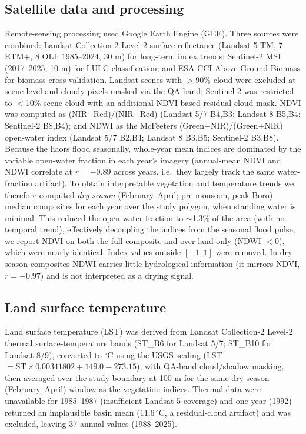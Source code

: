 \documentclass[preprint,authoryear,12pt]{elsarticle}
\begin{document}
\subsection{Satellite data and processing}
\label{subsec:rs}
Remote-sensing processing used Google Earth Engine (GEE). Three sources were combined:
Landsat Collection-2 Level-2 surface reflectance (Landsat 5 TM, 7 ETM+, 8 OLI; 1985--2024,
30 m) for long-term index trends; Sentinel-2 MSI (2017--2025, 10 m) for LULC classification;
and ESA CCI Above-Ground Biomass for biomass cross-validation. Landsat scenes with $>$90\%
cloud were excluded at scene level and cloudy pixels masked via the QA band; Sentinel-2 was
restricted to $<$10\% scene cloud with an additional NDVI-based residual-cloud mask. NDVI was
computed as (NIR$-$Red)/(NIR$+$Red) (Landsat 5/7 B4,B3; Landsat 8 B5,B4; Sentinel-2 B8,B4);
and NDWI as the McFeeters (Green$-$NIR)/(Green$+$NIR) open-water index \citep{McFeeters1996}
(Landsat 5/7 B2,B4; Landsat 8 B3,B5; Sentinel-2 B3,B8). Because the haors flood seasonally, whole-year mean indices are dominated by the variable open-water
fraction in each year's imagery (annual-mean NDVI and NDWI correlate at $r=-0.89$ across years,
i.e.\ they largely track the same water-fraction artifact). To obtain interpretable vegetation
and temperature trends we therefore computed \emph{dry-season} (February--April; pre-monsoon,
peak-Boro) median composites for each year over the study polygon, when standing water is
minimal. This reduced the open-water fraction to $\sim$1.3\% of the area (with no temporal trend),
effectively decoupling the indices from the seasonal flood pulse; we report NDVI on both the full
composite and over land only (NDWI $<0$), which were nearly identical. Index values outside
$[-1,1]$ were removed. In dry-season composites NDWI carries little hydrological information (it
mirrors NDVI, $r=-0.97$) and is not interpreted as a drying signal.

\subsection{Land surface temperature}
\label{subsec:lst}
Land surface temperature (LST) was derived from Landsat Collection-2 Level-2 thermal
surface-temperature bands (ST\_B6 for Landsat 5/7; ST\_B10 for Landsat 8/9), converted to
$^{\circ}$C using the USGS scaling (LST $= \mathrm{ST} \times 0.00341802 + 149.0 - 273.15$),
with QA-band cloud/shadow masking, then averaged over the study boundary at 100 m for the same
dry-season (February--April) window as the vegetation indices.
Thermal data were unavailable for 1985--1987 (insufficient Landsat-5 coverage) and one year
(1992) returned an implausible basin mean ($11.6\,^{\circ}$C, a residual-cloud artifact) and
was excluded, leaving 37 annual values (1988--2025).
\end{document}
